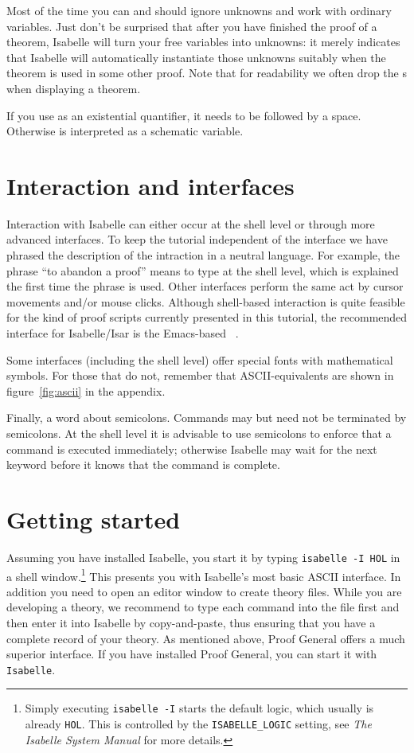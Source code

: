 Most of the time you can and should ignore unknowns and work with ordinary
variables. Just don't be surprised that after you have finished the proof of
a theorem, Isabelle will turn your free variables into unknowns: it merely
indicates that Isabelle will automatically instantiate those unknowns
suitably when the theorem is used in some other proof.
Note that for readability we often drop the s when displaying a theorem.
\begin{warn}
  If you use  as an existential
  quantifier, it needs to be followed by a space. Otherwise  is
  interpreted as a schematic variable.
\end{warn}

\section{Interaction and interfaces}

Interaction with Isabelle can either occur at the shell level or through more
advanced interfaces. To keep the tutorial independent of the interface we
have phrased the description of the intraction in a neutral language. For
example, the phrase ``to abandon a proof'' means to type  at the
shell level, which is explained the first time the phrase is used. Other
interfaces perform the same act by cursor movements and/or mouse clicks.
Although shell-based interaction is quite feasible for the kind of proof
scripts currently presented in this tutorial, the recommended interface for
Isabelle/Isar is the Emacs-based ~\cite{Aspinall:TACAS:2000,proofgeneral}.

Some interfaces (including the shell level) offer special fonts with
mathematical symbols. For those that do not, remember that ASCII-equivalents
are shown in figure~\ref{fig:ascii} in the appendix.

Finally, a word about semicolons. 
Commands may but need not be terminated by semicolons.
At the shell level it is advisable to use semicolons to enforce that a command
is executed immediately; otherwise Isabelle may wait for the next keyword
before it knows that the command is complete.


\section{Getting started}

Assuming you have installed Isabelle, you start it by typing \texttt{isabelle
  -I HOL} in a shell window.\footnote{Simply executing \texttt{isabelle -I}
  starts the default logic, which usually is already \texttt{HOL}.  This is
  controlled by the \texttt{ISABELLE_LOGIC} setting, see \emph{The Isabelle
    System Manual} for more details.} This presents you with Isabelle's most
basic ASCII interface.  In addition you need to open an editor window to
create theory files.  While you are developing a theory, we recommend to
type each command into the file first and then enter it into Isabelle by
copy-and-paste, thus ensuring that you have a complete record of your theory.
As mentioned above, Proof General offers a much superior interface.
If you have installed Proof General, you can start it with \texttt{Isabelle}.
